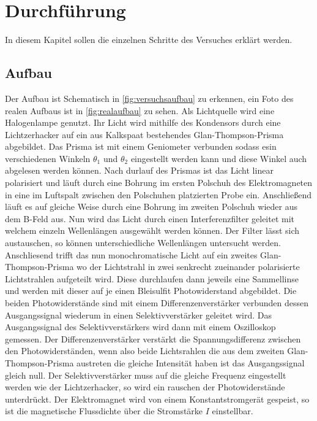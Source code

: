 \section{Durchführung}
\label{sec:Durchfuehrung}
In diesem Kapitel sollen die einzelnen Schritte des Versuches erklärt werden.
\subsection{Aufbau}
\label{sec:aufbau}
Der Aufbau ist Schematisch in \autoref{fig:versuchsaufbau} zu erkennen, ein Foto des realen Aufbaus ist in 
\autoref{fig:realaufbau} zu sehen. Als Lichtquelle wird eine Halogenlampe
genutzt. Ihr Licht wird mithilfe des Kondensors durch eine Lichtzerhacker auf ein aus Kalkspaat bestehendes Glan-Thompson-Prisma abgebildet.
Das Prisma ist mit einem Geniometer verbunden sodass esin verschiedenen Winkeln $\theta_1$ und $\theta_2$ eingestellt
werden kann und diese Winkel auch abgelesen werden können. Nach durlauf des Prismas ist das Licht linear 
polarisiert und läuft durch eine Bohrung im ersten Polschuh des Elektromagneten in eine im Luftspalt zwischen 
den Polschuhen platzierten Probe ein. Anschließend läuft es auf gleiche Weise durch eine Bohrung im zweiten Polschuh
wieder aus dem B-Feld aus. Nun wird das Licht durch einen Interferenzfilter geleitet mit welchem einzeln
Wellenlängen ausgewählt werden können. Der Filter lässt sich austauschen, so können unterschiedliche Wellenlängen
untersucht werden. Anschliesend trifft das nun monochromatische Licht auf ein zweites Glan-Thompson-Prisma
wo der Lichtstrahl in zwei senkrecht zueinander polarisierte Lichtstrahlen aufgeteilt wird. Diese durchlaufen dann
jeweils eine Sammellinse und werden mit dieser auf je einen Bleisulfit Photowiderstand abgebildet. Die beiden
Photowiderstände sind mit einem Differenzenverstärker verbunden dessen Ausgangssignal wiederum in einen 
Selektivverstärker geleitet wird. Das Ausgangssignal des Selektivverstärkers wird dann mit einem Oszilloskop
gemessen. Der Differenzenverstärker verstärkt die Spannungsdifferenz zwischen den Photowiderständen, wenn also 
beide Lichtsrahlen die aus dem zweiten Glan-Thompson-Prisma austreten die gleiche Intensität haben ist das 
Ausgangssignal gleich null. Der Selektivverstärker muss auf die gleiche Frequenz eingestellt werden wie 
der Lichtzerhacker, so wird ein rauschen der Photowiderstände unterdrückt. Der Elektromagnet wird von einem 
Konstantstromgerät gespeist, so ist die magnetische Flussdichte über die Stromstärke $I$ einstellbar.

